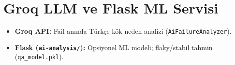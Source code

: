 \section{Groq LLM ve Flask ML Servisi}
\begin{itemize}
  \item \textbf{Groq API:} Fail anında Türkçe kök neden analizi (\texttt{AiFailureAnalyzer}).
  \item \textbf{Flask (\texttt{ai-analysis/}):} Opsiyonel ML modeli; flaky/stabil tahmin (\texttt{qa\_model.pkl}).
\end{itemize}

